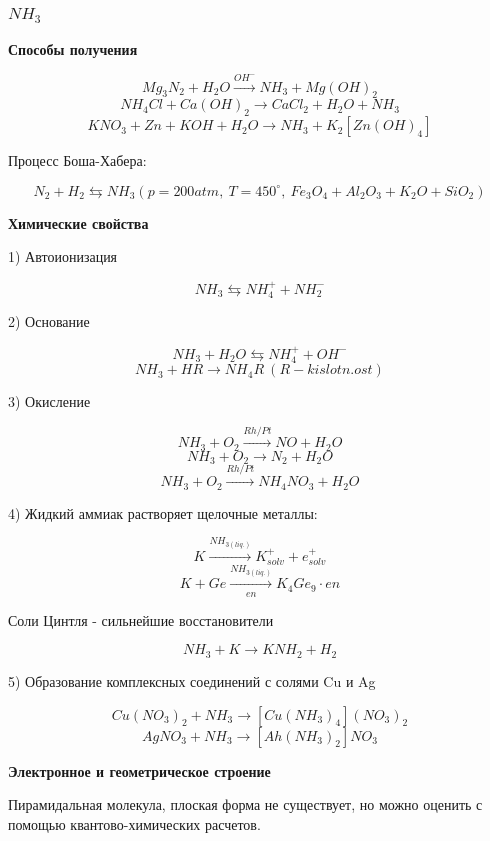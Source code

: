 \subsubsection*{$NH_3$}

\textbf{Способы получения}

$$Mg_3N_2 + H_2O \xrightarrow{OH^-} NH_3 + Mg(OH)_2$$
$$NH_4Cl + Ca(OH)_2 \rightarrow CaCl_2 + H_2O + NH_3$$
$$KNO_3 + Zn + KOH + H_2O \rightarrow NH_3 + K_2[Zn(OH)_4]$$

Процесс Боша-Хабера:

$$ N_2 + H_2 \leftrightarrows NH_3 (p=200 atm, \ T = 450^{\circ},\ Fe_3O_4 + Al_2O_3 + K_2O + SiO_2)$$

\textbf{Химические свойства}

1) Автоионизация

$$NH_3 \leftrightarrows NH_4^+ + NH_2^-$$

2)  Основание

$$NH_3 + H_2O \leftrightarrows NH_4^+ + OH^-$$
$$NH_3 + HR \rightarrow NH_4R \ (R - kislotn. ost)$$

3) Окисление

$$NH_3 + O_2 \xrightarrow{Rh/Pt} NO + H_2O$$
$$NH_3 + O_2 \rightarrow N_2 + H_2O$$
$$NH_3 + O_2 \xrightarrow{Rh/Pt} NH_4NO_3 + H_2O$$

4) Жидкий аммиак растворяет щелочные металлы:

$$K \xrightarrow{NH_{3(liq.)}} K_{solv}^+ + e_{solv}^+$$
$$ K + Ge \xrightarrow[en]{NH_{3(liq.)}} K_4Ge_9\cdot en$$

Соли Цинтля - сильнейшие восстановители

$$NH_3 + K \rightarrow KNH_2 + H_2$$

5) Образование комплексных соединений с солями Cu и Ag

$$Cu(NO_3)_2 + NH_3 \rightarrow [Cu(NH_3)_4](NO_3)_2$$
$$AgNO_3 + NH_3 \rightarrow [Ah(NH_3)_2]NO_3$$

\textbf{Электронное и геометрическое строение}

Пирамидальная молекула, плоская форма не существует, но можно оценить с помощью квантово-химических расчетов.

